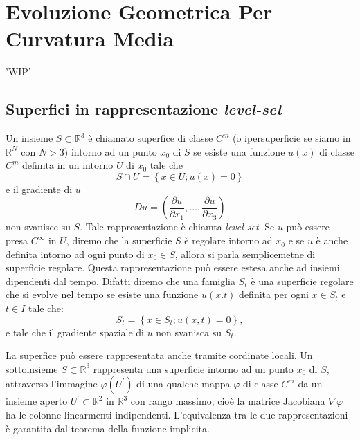 \chapter{Evoluzione Geometrica Per Curvatura Media}
'WIP'
%
%
\section{Superfici in rappresentazione \emph{level-set}}
\label{sec:cp1-00}
Un insieme $S\subset\mathbb{R}^3$ è chiamato superfice di classe $C^m$ (o ipersuperficie se siamo in $\mathbb{R}^N$ con $N>3$) intorno ad un punto $x_0$ di $S$ se esiste una funzione $u(x)$ di classe $C^m$ definita in un intorno $U$ di $x_0$ tale che
\[
S\cap U=\left\{x\in U; u(x)=0\right\}
\]
e il gradiente di $u$
\[
 Du=\left(\frac{\partial u}{\partial x_1},\dots,\frac{\partial u}{\partial x_3}\right)
\]
non svanisce su $S$. Tale rappresentazione è chiamta \emph{level-set}. Se $u$ può essere presa $C^{\infty}$ in $U$, diremo che la superficie $S$ è regolare intorno ad $x_0$ e se $u$ è anche definita intorno ad ogni punto di $x_0\in S$, allora si parla semplicemetne di superficie regolare. Questa rappresentazione può essere estesa anche ad insiemi dipendenti dal tempo. Difatti diremo che una famiglia $S_t$ è una superficie regolare che si evolve nel tempo se esiste una funzione $u(x.t)$ definita per ogni $x\in S_t$ e $t\in I$ tale che:
\[
S_t=\left\{x\in S_t; u(x,t)=0\right\},
\]
e tale che il gradiente spaziale di $u$ non svanisca su $S_t$.
\begin{osservazione}
 La superfice può essere rappresentata anche tramite cordinate locali. Un sottoinsieme $S\subset\mathbb{R}^3$ rappresenta una superficie intorno ad un punto $x_0$ di $S$, attraverso l'immagine $\varphi(U^{'})$ di una qualche mappa $\varphi$ di classe $C^m$ da un insieme aperto $U^{'}\subset\mathbb{R}^2$ in $\mathbb{R}^3$ con rango massimo, cioè la matrice Jacobiana $\nabla\varphi$ ha le colonne linearmenti indipendenti.
L'equivalenza tra le due rappresentazioni è garantita dal teorema della funzione implicita.
\end{osservazione} 

